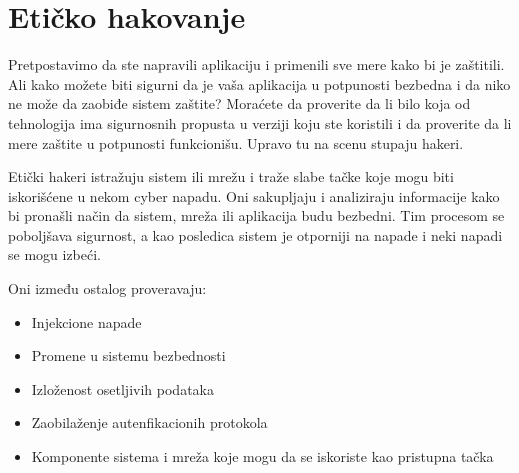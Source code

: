 \documentclass[a4paper]{article}
\begin{document}
{\section{Etičko hakovanje}	
\label{sec:proces}
Pretpostavimo da ste napravili aplikaciju i primenili sve mere kako bi je zaštitili. Ali kako možete biti sigurni da je vaša aplikacija u potpunosti bezbedna i da niko ne može da zaobiđe sistem zaštite? Moraćete da proverite da li bilo koja od tehnologija ima sigurnosnih propusta u verziji koju ste koristili i da proverite da li mere zaštite u potpunosti funkcionišu. Upravo tu na scenu stupaju hakeri.

Etički hakeri istražuju sistem ili mrežu i traže slabe tačke koje mogu biti iskorišćene u nekom cyber napadu. Oni sakupljaju i analiziraju informacije kako bi pronašli način da sistem, mreža ili aplikacija budu bezbedni. Tim procesom se poboljšava sigurnost, a kao posledica sistem je otporniji na napade i neki napadi se mogu izbeći.

Oni između ostalog proveravaju:
\begin{itemize}
\item Injekcione napade
\item Promene u sistemu bezbednosti
\item Izloženost osetljivih podataka
\item Zaobilaženje autenfikacionih protokola
\item Komponente sistema i mreža koje mogu da se iskoriste kao pristupna tačka \cite{whatisethacking}
\end{itemize}  

}
\end{document}
